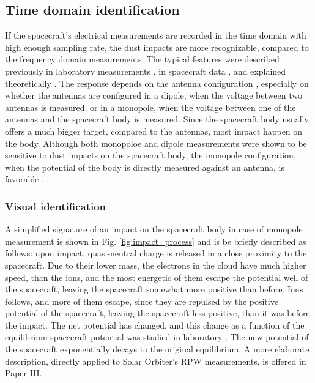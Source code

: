 \subsection{Time domain identification}

If the spacecraft's electrical measurements are recorded in the time domain with high enough sampling rate, the dust impacts are more recognizable, compared to the frequency domain measurements. The typical features were described previously in laboratory measurements \citep{auer1968,nouzak2018laboratory,shen2021laboratory,shen2023variability}, in spacecraft data \citep{zaslavsky2012interplanetary,kellogg2016dust,vaverka2021ion}, and explained theoretically \citep{zaslavsky2015floating,meyer2017frequency,shen2021electrostatic,babic2022analytical}. The response depends on the antenna configuration \citep{shen2023variability,vaverka2021ion}, especially on whether the antennas are configured in a dipole, when the voltage between two antennas is measured, or in a monopole, when the voltage between one of the antennas and the spacecraft body is measured. Since the spacecraft body usually offers a much bigger target, compared to the antennas, most impact happen on the body. Although both monopoloe and dipole measurements were shown to be sensitive to dust impacts on the spacecraft body, the monopole configuration, when the potential of the body is directly measured against an antenna, is favorable \citep{meyer2014importance,mann2019dust}. 

\subsubsection{Visual identification}

A simplified signature of an impact on the spacecraft body in case of monopole measurement is shown in Fig. \ref{fig:impact_process} and is be briefly described as follows: upon impact, quasi-neutral charge is released in a close proximity to the spacecraft. Due to their lower mass, the electrons in the cloud have much higher speed, than the ions, and the most energetic of them escape the potential well of the spacecraft, leaving the spacecraft somewhat more positive than before. Ions follows, and more of them escape, since they are repulsed by the positive potential of the spacecraft, leaving the spacecraft less positive, than it was before the impact. The net potential has changed, and this change as a function of the equilibrium spacecraft potential was studied in laboratory \citep{collette2016characteristic,kovcivsvcak2020effective}. The new potential of the spacecraft exponentially decays to the original equilibrium. A more elaborate description, directly applied to Solar Orbiter's RPW measurements, is offered in Paper III.

